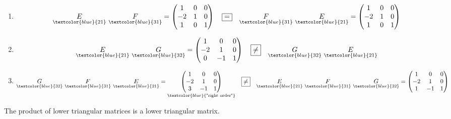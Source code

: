 \begin{enumerate}[label=(\arabic*)]
    \item \[
    \underset{\textcolor{blue}{\text{21}}}{E}\ \underset{\textcolor{blue}{\text{31}}}{F} = \left(\begin{matrix}
    1 & 0 & 0\\
    -2 & 1 & 0\\
    1 & 0 & 1
    \end{matrix}\right)\quad \boxed{=} \quad \underset{\textcolor{blue}{\text{31}}}{F}\ \underset{\textcolor{blue}{\text{21}}}{E} = \left(\begin{matrix}
    1 & 0 & 0\\
    -2 & 1 & 0\\
    1 & 0 & 1
    \end{matrix}\right)
    \]

    \item \[
    \underset{\textcolor{blue}{\text{21}}}{E} \ \underset{\textcolor{blue}{\text{32}}}{G} = \left(\begin{matrix}
    1 & 0 & 0\\
    -2 & 1 & 0\\
    0 & -1 & 1
    \end{matrix}\right)\quad \boxed{\neq} \quad \underset{\textcolor{blue}{\text{32}}}{G}\ \underset{\textcolor{blue}{\text{21}}}{E}
    \]

    \item \[
    \underset{\textcolor{blue}{\text{32}}}{G}\ \underset{\textcolor{blue}{\text{31}}}{F}\ \underset{\textcolor{blue}{\text{21}}}{E} = \underset{\textcolor{blue}{\text{"right order"}}}{\left(\begin{matrix}
    1 & 0 & 0\\
    -2 & 1 & 0\\
    3 & -1 & 1
    \end{matrix}\right)}\quad \boxed{\neq} \quad \underset{\textcolor{blue}{\text{21}}}{E}\ \underset{\textcolor{blue}{\text{31}}}{F}\ \underset{\textcolor{blue}{\text{32}}}{G} = \left(\begin{matrix}
    1 & 0 & 0\\
    -2 & 1 & 0\\
    1 & -1 & 1
    \end{matrix}\right)
    \]
\end{enumerate}
  
\begin{note}
    The product of lower triangular matrices is a lower triangular matrix.
\end{note}

\newpage